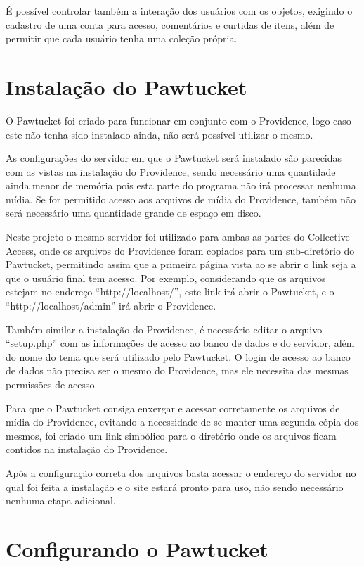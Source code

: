 \documentclass[a4paper,12pt,oneside,onecolumn,final,fleqn]{repUERJ}
\begin{document}
É possível controlar também a interação dos usuários com os objetos, exigindo o cadastro de uma conta para acesso, comentários e curtidas de itens, além de permitir que cada usuário tenha uma coleção própria.

\section{Instalação do Pawtucket}

O Pawtucket foi criado para funcionar em conjunto com o Providence, logo caso este não tenha sido instalado ainda, não será possível utilizar o mesmo.

As configurações do servidor em que o Pawtucket será instalado são parecidas com as vistas na instalação do Providence, sendo necessário uma quantidade ainda menor de memória pois esta parte do programa não irá processar nenhuma mídia. Se for permitido acesso aos arquivos de mídia do Providence, também não será necessário uma quantidade grande de espaço em disco.

Neste projeto o mesmo servidor foi utilizado para ambas as partes do Collective Access, onde os arquivos do Providence foram copiados para um sub-diretório do Pawtucket, permitindo assim que a primeira página vista ao se abrir o link seja a que o usuário final tem acesso. Por exemplo, considerando que os arquivos estejam no endereço ``http://localhost/'', este link irá abrir o Pawtucket, e o ``http://localhost/admin'' irá abrir o Providence.

Também similar a instalação do Providence, é necessário editar o arquivo ``setup.php'' com as informações de acesso ao banco de dados e do servidor, além do nome do tema que será utilizado pelo Pawtucket. O login de acesso ao banco de dados não precisa ser o mesmo do Providence, mas ele necessita das mesmas permissões de acesso.

Para que o Pawtucket consiga enxergar e acessar corretamente os arquivos de mídia do Providence, evitando a necessidade de se manter uma segunda cópia dos mesmos, foi criado um link simbólico para o diretório onde os arquivos ficam contidos na instalação do Providence.

Após a configuração correta dos arquivos basta acessar o endereço do servidor no qual foi feita a instalação e o site estará pronto para uso, não sendo necessário nenhuma etapa adicional.

\section{Configurando o Pawtucket}
\end{document}
